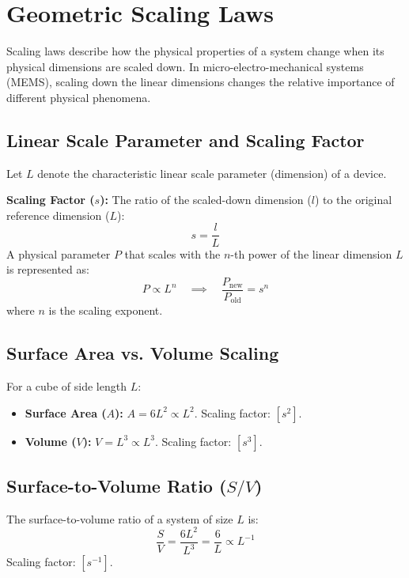 \documentclass[12pt,a4paper]{article}
\begin{document}
\section{Geometric Scaling Laws}

Scaling laws describe how the physical properties of a system change when its physical dimensions are scaled down. In micro-electro-mechanical systems (MEMS), scaling down the linear dimensions changes the relative importance of different physical phenomena.

\subsection{Linear Scale Parameter and Scaling Factor}
Let $L$ denote the characteristic linear scale parameter (dimension) of a device. 
\begin{tcolorbox}[defbox]
\textbf{Scaling Factor ($s$):} The ratio of the scaled-down dimension ($l$) to the original reference dimension ($L$):
$$s = \frac{l}{L}$$
A physical parameter $P$ that scales with the $n$-th power of the linear dimension $L$ is represented as:
$$P \propto L^n \quad \implies \quad \frac{P_{\text{new}}}{P_{\text{old}}} = s^n$$
where $n$ is the scaling exponent.
\end{tcolorbox}

\subsection{Surface Area vs. Volume Scaling}
For a cube of side length $L$:
\begin{itemize}[leftmargin=*, itemsep=3pt]
  \item \textbf{Surface Area ($A$):} $A = 6L^2 \propto L^2$. Scaling factor: $[s^2]$.
  \item \textbf{Volume ($V$):} $V = L^3 \propto L^3$. Scaling factor: $[s^3]$.
\end{itemize}

\subsection{Surface-to-Volume Ratio \texorpdfstring{($S/V$)}{S/V}}
The surface-to-volume ratio of a system of size $L$ is:
$$\frac{S}{V} = \frac{6L^2}{L^3} = \frac{6}{L} \propto L^{-1}$$
Scaling factor: $[s^{-1}]$.
\end{document}
